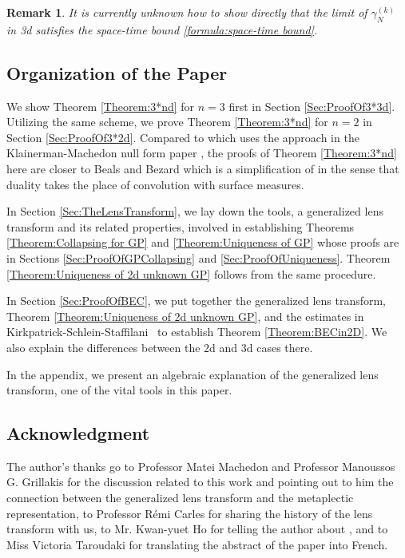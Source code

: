 \documentclass[reqno]{amsart}
\theoremstyle{plain}
\newtheorem{remark}{Remark}
\numberwithin{equation}{section}
\begin{document}
\begin{remark}
It is currently unknown how to show directly that the limit of $\gamma
_{N}^{(k)}$ in 3d satisfies the space-time bound \ref{formula:space-time
bound}.
\end{remark}

\subsection{Organization of the Paper}

We show Theorem \ref{Theorem:3*nd} for $n=3$ first in Section \ref{Sec:ProofOf3*3d}. Utilizing the same scheme, we prove Theorem \ref{Theorem:3*nd} for $n=2$ in Section \ref{Sec:ProofOf3*2d}. Compared to \cite{KlainermanAndMachedon} which uses the approach in the Klainerman-Machedon
null form paper \cite{KlainermanMachedonNullForm}, the proofs of Theorem \ref{Theorem:3*nd} here are closer to Beals and Bezard \cite{BealsAndBezard}
which is a simplification of \cite{KlainermanMachedonNullForm} in the sense
that duality takes the place of convolution with surface measures.

In Section \ref{Sec:TheLensTransform}, we lay down the tools, a generalized
lens transform and its related properties, involved in establishing Theorems \ref{Theorem:Collapsing for GP} and \ref{Theorem:Uniqueness of GP} whose
proofs are in Sections \ref{Sec:ProofOfGPCollapsing} and \ref{Sec:ProofOfUniqueness}. Theorem \ref{Theorem:Uniqueness of 2d unknown GP}
follows from the same procedure.

In Section \ref{Sec:ProofOfBEC}, we put together the generalized lens
transform, Theorem \ref{Theorem:Uniqueness of 2d unknown GP}, and the
estimates in Kirkpatrick-Schlein-Staffilani \cite{Kirpatrick}\ to establish
Theorem \ref{Theorem:BECin2D}. We also explain the differences between the
2d and 3d cases there.

In the appendix, we present an algebraic explanation of the generalized lens
transform, one of the vital tools in this paper.

\subsection{Acknowledgment}

The author's thanks go to Professor Matei Machedon and Professor Manoussos
G. Grillakis for the discussion related to this work and pointing out to him
the connection between the generalized lens transform and the metaplectic
representation, to Professor R\'{e}mi Carles for sharing the history of the
lens transform with us, to Mr. Kwan-yuet Ho for telling the author about 
\cite{Philips}, and to Miss Victoria Taroudaki for translating the abstract
of the paper into French.
\end{document}
